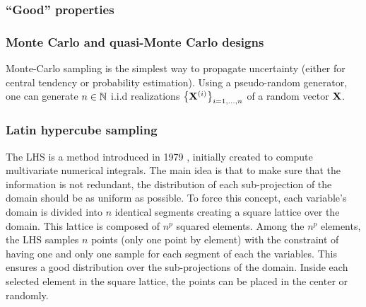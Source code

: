 \subsubsection{``Good'' properties}

\subsubsection{Monte Carlo and quasi-Monte Carlo designs}

Monte-Carlo sampling is the simplest way to propagate uncertainty (either for central tendency or probability estimation). 
Using a pseudo-random generator, one can generate $n \in \mathbb{N}$ i.i.d realizations $\left\{{\bf X}^{(i)}\right\}_{i=1,...,n}$ of a random vector ${\bf X}$.


\subsubsection{Latin hypercube sampling}
The LHS is a method introduced in 1979 \citep{mckay_beckman_1979}, initially created to compute multivariate numerical integrals. 
The main idea is that to make sure that the information is not redundant, the distribution of each sub-projection of the domain should be as uniform as possible. 
To force this concept, each variable's domain is divided into $n$ identical segments creating a square lattice over the domain. 
This lattice is composed of $n^{p}$ squared elements. 
Among the $n^{p}$ elements, the LHS samples $n$ points (only one point by element) with the constraint of having one and only one sample for each segment of each the variables. 
This ensures a good distribution over the sub-projections of the domain. 
Inside each selected element in the square lattice, the points can be placed in the center or randomly.


